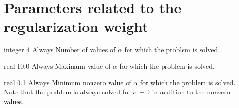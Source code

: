 \section{Parameters related to the regularization weight}

{integer}
{4}
{Always}
{Number of values of $\alpha$ for which the problem is solved.}

\myhrule

{real}
{10.0}
{Always}
{Maximum value of $\alpha$ for which the problem is solved.}

\myhrule

{real}
{0.1}
{Always}
{Minimum nonzero value of $\alpha$ for which the problem is solved.
Note that the problem is always solved for $\alpha=0$ in addition to
the nonzero values.}

